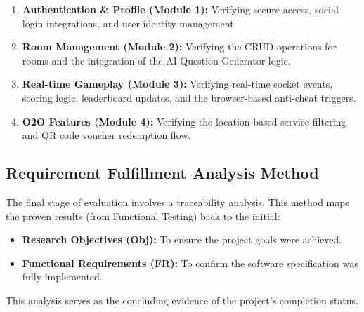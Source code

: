 \begin{enumerate}
    \item \textbf{Authentication \& Profile (Module 1):} Verifying secure access, social login integrations, and user identity management.
    \item \textbf{Room Management (Module 2):} Verifying the CRUD operations for rooms and the integration of the AI Question Generator logic.
    \item \textbf{Real-time Gameplay (Module 3):} Verifying real-time socket events, scoring logic, leaderboard updates, and the browser-based anti-cheat triggers.
    \item \textbf{O2O Features (Module 4):} Verifying the location-based service filtering and QR code voucher redemption flow.
\end{enumerate}

\subsection{Requirement Fulfillment Analysis Method}
The final stage of evaluation involves a traceability analysis. This method maps the proven results (from Functional Testing) back to the initial:
\begin{itemize}
    \item \textbf{Research Objectives (Obj):} To ensure the project goals were achieved.
    \item \textbf{Functional Requirements (FR):} To confirm the software specification was fully implemented.
\end{itemize}
This analysis serves as the concluding evidence of the project's completion status.
